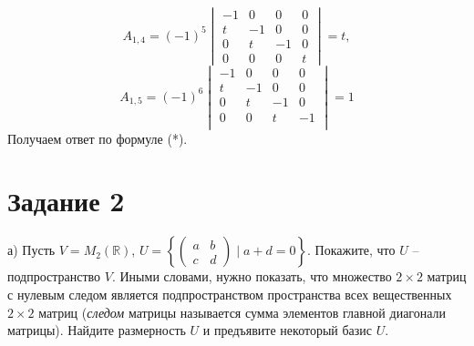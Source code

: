 \documentclass[a4paper,12pt]{article}
\begin{document}
$$A_{1,4}=(-1)^{5}
\begin{vmatrix}
-1&0&0&0\\
t&-1&0&0\\
0&t&-1&0\\
0&0&0&t
\end{vmatrix}
=t,$$
$$A_{1,5}=(-1)^{6}
\begin{vmatrix}
-1&0&0&0\\
t&-1&0&0\\
0&t&-1&0\\
0&0&t&-1\\
\end{vmatrix}
=1$$
Получаем ответ по формуле (*).
\vspace{5pt}\\

\section*{Задание 2}
 а) Пусть $V = M_2(\mathbb{R})$, $U = \left\{\left(\begin{smallmatrix}
a & b \\
c & d
\end{smallmatrix} \right) \mid a + d = 0 \right\}$. Покажите, что $U$ -- подпространство $V$. Иными словами, нужно показать, что множество $2\times 2$ матриц с нулевым следом является подпространством пространства всех вещественных $2\times 2$ матриц ({\it следом} матрицы называется сумма элементов главной диагонали матрицы).
Найдите размерность $U$ и предъявите некоторый базис $U$.
\end{document}
